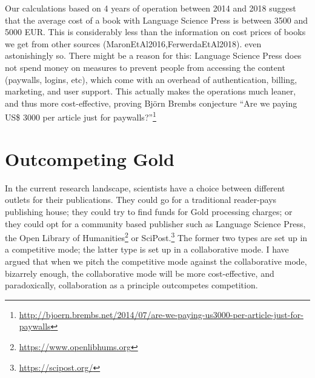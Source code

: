 \documentclass[12pt]{article}
\newcommand{\citep}[1]{(#1)}
\begin{document}
Our calculations based on 4 years of operation between 2014 and 2018 suggest that the average cost of a book with Language Science Press is between 3500 and 5000 EUR. This is considerably less than the information on cost prices of books we get from other sources \citep{MaronEtAl2016,FerwerdaEtAl2018}.
even astonishingly so. There might be a reason for this: Language Science Press does not spend money on measures to prevent people from accessing the content (paywalls, logins, etc), which come with an overhead of authentication, billing, marketing, and user support. This actually makes the operations much leaner, and thus more cost-effective, proving Björn Brembs conjecture ``Are we paying US\$ 3000 per article just for paywalls?''\footnote{\url{http://bjoern.brembs.net/2014/07/are-we-paying-us3000-per-article-just-for-paywalls}}

  
\section{Outcompeting Gold}            
In the current research landscape, scientists have a choice between different outlets for their publications. They could go for a traditional reader-pays publishing house; they could try to find funds for Gold processing charges; or they could opt for a community based publisher such as Language Science Press, the Open Library of Humanities\footnote{\url{https://www.openlibhums.org}} or SciPost.\footnote{\url{https://scipost.org/}}  The former two types are set up in a competitive mode; the latter type is set up in a collaborative mode. I have argued that when we pitch the competitive mode against the collaborative mode, bizarrely enough, the collaborative mode will be more cost-effective, and paradoxically, collaboration as a principle outcompetes competition. 
 

\sloppy
\printbibliography
\end{document}
